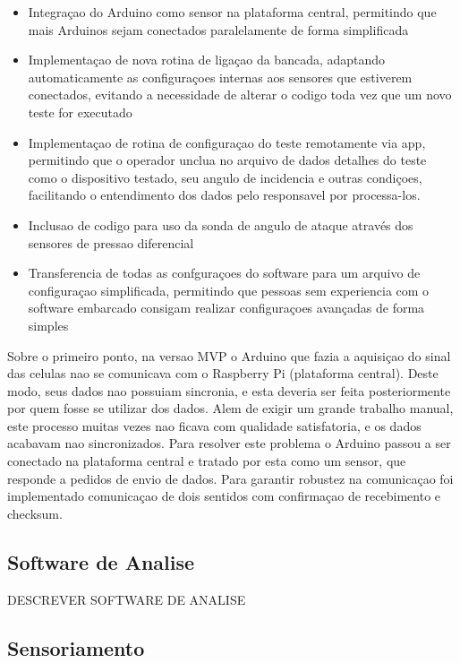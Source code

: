\begin{itemize}
    \item Integraçao do Arduino como sensor na plataforma central, permitindo que mais Arduinos sejam conectados paralelamente de forma simplificada
    \item Implementaçao de nova rotina de ligaçao da bancada, adaptando automaticamente as configuraçoes internas aos sensores que estiverem conectados, evitando a necessidade de alterar o codigo toda vez que um novo teste for executado
    \item Implementaçao de rotina de configuraçao do teste remotamente via app, permitindo que o operador unclua no arquivo de dados detalhes do teste como o dispositivo testado, seu angulo de incidencia e outras condiçoes, facilitando o entendimento dos dados pelo responsavel por processa-los. 
    \item Inclusao de codigo para uso da sonda de angulo de ataque através dos sensores de pressao diferencial
    \item Transferencia de todas as confguraçoes do software para um arquivo de configuraçao simplificada, permitindo que pessoas sem experiencia com o software embarcado consigam realizar configuraçoes avançadas de forma simples
\end{itemize}

Sobre o primeiro ponto, na versao MVP o Arduino que fazia a aquisiçao do sinal das celulas nao se comunicava com o Raspberry Pi (plataforma central). Deste modo, seus dados nao possuiam sincronia, e esta deveria ser feita posteriormente por quem fosse se utilizar dos dados. Alem de exigir um grande trabalho manual, este processo muitas vezes nao ficava com qualidade satisfatoria, e os dados acabavam nao sincronizados. Para resolver este problema o Arduino passou a ser conectado na plataforma central e tratado por esta como um sensor, que responde a pedidos de envio de dados. Para garantir robustez na comunicaçao foi implementado comunicaçao de dois sentidos com confirmaçao de recebimento e checksum.  

\subsection{Software de Analise}

DESCREVER SOFTWARE DE ANALISE

\subsection{Sensoriamento}

